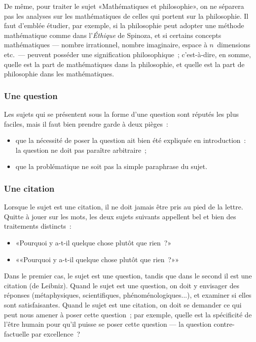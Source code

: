 \documentclass[a4paper,11pt]{article}
\newcommand{\cad}{c'est-à-dire}
\begin{document}
\par

De même, pour traiter le sujet «Mathématiques et philosophie», on ne
séparera pas les analyses sur les mathématiques de celles qui portent
sur la philosophie. Il faut d'emblée étudier, par exemple, si la
philosophie peut adopter une méthode mathématique comme dans
l'\emph{Éthique} de Spinoza, et si certains concepts mathématiques ---
nombre irrationnel, nombre imaginaire, espace à $n$~dimensions etc.~---
peuvent posséder une signification philosophique~; \cad{}, en somme,
quelle est la part de mathématiques dans la philosophie, et quelle est
la part de philosophie dans les mathématiques.



\subsubsection{Une question}

Les sujets qui se présentent sous la forme d'une question sont réputés
les plus faciles, mais il faut bien prendre garde à deux pièges~:
\begin{itemize}
\item que la nécessité de poser la question ait bien été expliquée en
  introduction~: la question ne doit pas paraître arbitraire~;
\item que la problématique ne soit pas la simple paraphrase du sujet.
\end{itemize}


\subsubsection{Une citation}

Lorsque le sujet est une citation, il ne doit jamais être pris au pied
de la lettre. Quitte à jouer sur les mots, les deux sujets suivants
appellent bel et bien des traitements distincts~:
\begin{itemize}
\item «Pourquoi y a-t-il quelque chose plutôt que rien~?»
\item ««Pourquoi y a-t-il quelque chose plutôt que rien~?»»
\end{itemize}
Dans le premier cas, le sujet est une question, tandis que dans le
second il est une citation (de Leibniz). Quand le sujet est une
question, on doit y envisager des réponses (métaphysiques,
scientifiques, phénoménologiques...), et examiner si elles sont
satisfaisantes. Quand le sujet est une citation, on doit se demander ce
qui peut nous amener à poser cette question~; par exemple, quelle est la
spécificité de l'être humain pour qu'il puisse se poser cette question
--- la question contre-factuelle par excellence~?
\end{document}
